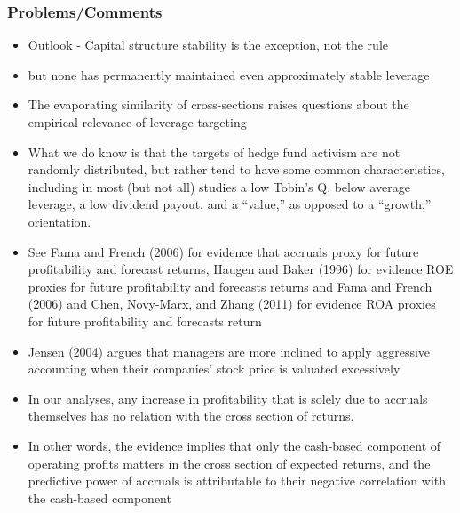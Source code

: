 \documentclass[12pt]{article}
\begin{document}
    \subsubsection{Problems/Comments}

        \begin{itemize}

            \item Outlook - Capital structure stability is the exception, not the rule \citep{Deangelo2015}

            \item but none has permanently maintained even approximately stable leverage \citep{Deangelo2015}

            \item The evaporating similarity of cross-sections raises questions about the empirical relevance of leverage targeting \citep{Deangelo2015}

            \item What we do know is that the targets of hedge fund activism are not randomly distributed, but rather tend to have some common characteristics, including in most (but not all) studies a low Tobin’s Q, below average leverage, a low dividend payout, and a “value,” as opposed to a “growth,” orientation. \citep{CoffeeJr.2014}


            \item See Fama and French (2006) for evidence that accruals proxy for future profitability and forecast returns, Haugen and Baker (1996) for evidence ROE proxies for future profitability and forecasts returns and Fama and French (2006) and Chen, Novy-Marx, and Zhang (2011) for evidence ROA proxies for future profitability and forecasts return \citep{Choi2012}
            
            \item Jensen (2004) argues that managers are more inclined to apply aggressive accounting when their companies’ stock price is valuated excessively \citep{Mohr2012}

            
            \item In our analyses, any increase in profitability that is solely due to accruals themselves has no relation with the cross section of returns.\citep{Ball2016}

            \item In other words, the evidence implies that only the cash-based component of operating profits matters in the cross section of expected returns, and the predictive power of accruals is attributable to their negative correlation with the cash-based component \citep{Ball2016}

        \end{itemize}
    
\end{document}

